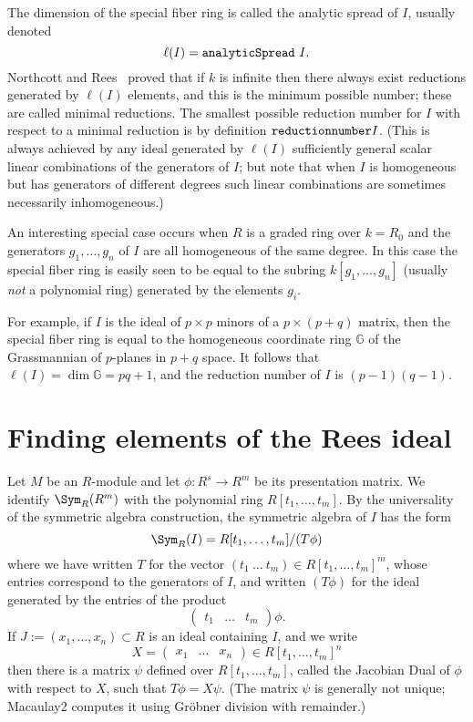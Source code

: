 \documentclass[twoside,12pt, leqno]{amsart}
\begin{document}
The dimension of the special fiber ring is called the analytic spread of $I$, usually
denoted
$$
\ell(I) = {\tt analyticSpread\ }I.
$$
Northcott and Rees~\cite{NR} proved that if $k$ is infinite then there always exist reductions
generated by $\ell(I)$ elements, and this is the minimum possible number; these are called
minimal reductions. The smallest possible reduction number for $I$ with respect to a minimal reduction is  by definition ${\tt reduction number} I$. (This is always achieved by any ideal generated by $\ell(I)$ sufficiently general scalar linear combinations of the generators of $I$; but note that when $I$ is homogeneous but has generators of different degrees such linear combinations are sometimes necessarily inhomogeneous.)

An interesting special case occurs when $R$ is a graded ring over $k = R_0$ and the generators $g_1,\dots, g_n$ of $I$ are all homogeneous of the same degree. In this case the special fiber ring is easily seen to be equal to the subring $k[g_1,\dots,g_n]$ (usually \emph{not} a polynomial ring) generated by the elements $g_i$.

\def\G{{\mathbb G}}
For example, if $I$ is the ideal of $p\times p$ minors of a $p\times (p+q)$ matrix, then
the special fiber ring is equal to the homogeneous coordinate ring $\G$ of the Grassmannian of
$p$-planes in $p+q$ space. It follows that $\ell(I) = \dim \G = pq+1$, and the reduction number of $I$ is
$(p-1)(q-1)$.

\section{Finding elements of the Rees ideal}%

Let $M$ be an $R$-module and let $\phi: R^{s}\to R^{m}$ be its presentation matrix.
     We  identify $\Sym_R(R^m)$ with the polynomial ring
     $R[t_1,\dots,t_m]$. By the universality of the symmetric algebra construction,
     the symmetric algebra of $I$ has the form     
     $$
     \Sym_R(I) = R[t_1,\dots,t_m]/(T\phi)
     $$
     where we have written $T$ for the vector
     $(t_{1}\ \dots\ t_{m}) \in R[t_1,\dots,t_m]^m$, whose entries correspond to the generators of $I$, and
      written $(T\phi)$  for the ideal generated by the entries
     of the product 
 $$
\begin{pmatrix}
 t_{1}&\dots&t_{m}
\end{pmatrix}\phi.
$$
 If $J := (x_1,\dots,x_n)\subset R$ is an ideal containing $I$, and we write
     $$
     X = \begin{pmatrix}
x_1&\dots&x_{n} 
\end{pmatrix}\in R[t_1,\dots,t_m]^n
$$
 then there is 
     a matrix $\psi$ defined over $R[t_1, \dots, t_m]$, called the Jacobian Dual of $\phi$ with respect to $X$,
     such that $T\phi = X\psi$. (The matrix $\psi$ is generally
     not unique; Macaulay2 computes it using Gr\"obner division with remainder.)
           
\end{document}
